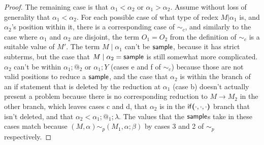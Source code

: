 \begin{proof}
The remaining case is that $\alpha_1 < \alpha_2$ or $\alpha_1 > \alpha_2$. 
Assume without loss of generality that $\alpha_1 < \alpha_2$. 
For each possible case of what type of redex $M | \alpha_1$ is, and $\alpha_2$'s position within it, there is a corresponding case of $\sim_c$, and similarly to the case where $\alpha_1$ and $\alpha_2$ are disjoint, the term $O_1 = O_2$ from the definition of $\sim_c$ is a suitable value of $M'$. 
The term $M \mid \alpha_1$ can't be $\mathsf{sample}$, because it has strict subterms, but the case that $M \mid \alpha_2 = \mathsf{sample}$ is still somewhat more complicated. 
$\alpha_2$ can't be within $\alpha_1 ; @_2$ or $\alpha_1 ; Y$ (cases e and f of $\sim_c$) because those are not valid positions to reduce a $\mathsf{sample}$, 
and the case that $\alpha_2$ is within the branch of an if statement that is deleted by the reduction at $\alpha_1$ (case b) doesn't actually present a problem because there is no corresponding reduction to $M \to M_2$ in the other branch, 
which leaves cases c and d, that $\alpha_2$ is in the $\mathsf{if}\boldsymbol{(}\cdot, \cdot, \cdot\boldsymbol{)}$ branch that isn't deleted, and that $\alpha_2 < \alpha_1 ; @_1 ; \lambda$.  
The values that the $\mathsf{sample}$s take in these cases match because $(M,\alpha) \sim_p (M_1, \alpha;\beta)$ by cases 3 and 2 of $\sim_p$ respectively.


\end{proof}
